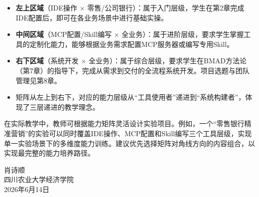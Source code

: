 \vspace{1em}

\begin{theorybox}[矩阵解读]
\begin{itemize}[leftmargin=1.5em]
  \item \textbf{左上区域}（IDE操作 $\times$ 零售/公司银行）：属于入门层级，学生在第2章完成IDE配置后，即可在各业务场景中进行基础实操。
  \item \textbf{中间区域}（MCP配置/Skill编写 $\times$ 全业务）：属于进阶层级，要求学生掌握工具的定制化能力，能够根据业务需求配置MCP服务器或编写专用Skill。
  \item \textbf{右下区域}（系统开发 $\times$ 全业务）：属于综合层级，要求学生在BMAD方法论（第7章）的指导下，完成从需求到交付的全流程系统开发。项目选题与团队管理见第8章。
  \item 矩阵从左上到右下，对应的能力层级从``工具使用者''递进到``系统构建者''，体现了三层递进的教学理念。
\end{itemize}
\end{theorybox}

\vspace{1em}

\begin{notebox}[教学提示]
在实际教学中，教师可根据能力矩阵灵活设计实验项目。例如，一个``零售银行精准营销''的实验可以同时覆盖IDE操作、MCP配置和Skill编写三个工具层级，实现单一实验场景下的多维度能力训练。建议优先选择矩阵对角线方向的内容组合，以实现最完整的能力培养路径。
\end{notebox}

\vspace{3em}

\begin{flushright}
\begin{minipage}{8cm}
\setlength{\parskip}{0.5em}
肖诗顺\\
四川农业大学经济学院\\
2026年6月14日
\end{minipage}
\end{flushright}
